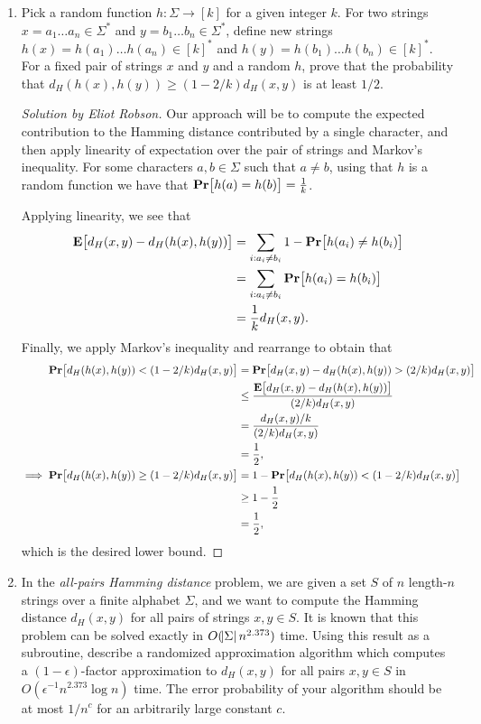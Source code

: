 \documentclass{article}
\newenvironment{solution}[1]{\begin{proof}[Solution by #1]}{\end{proof}}
\begin{document}
\begin{enumerate}
	\item Pick a random function \(h : \Sigma \to [k]\) for a given integer \(k\). For two strings \(x = a_1 \dots a_n \in \Sigma^*\) and \(y = b_1 \dots b_n \in \Sigma^*\), define new strings \(h(x) = h(a_1) \dots h(a_n) \in [k]^*\) and \(h(y) = h(b_1) \dots h(b_n) \in [k]^*\). For a fixed pair of strings \(x\) and \(y\) and a random \(h\), prove that the probability that \(d_H(h(x), h(y)) \geq (1 - 2/k) d_H(x, y)\) is at least \(1/2\).
	
	\begin{solution}{Eliot Robson}
		Our approach will be to compute the expected contribution to the Hamming distance contributed by a single character, and then apply linearity of expectation over the pair of strings and Markov's inequality. For some characters \(a, b \in \Sigma\) such that \(a \neq b\), using that \(h\) is a random function we have that \(\Prob{h(a) = h(b)} = \frac{1}{k}\).
		
		Applying linearity, we see that 
		\begin{align*}
			\Exp{d_H(x, y) - d_H (h(x), h(y))}
			&=%
			\sum_{i : a_i \neq b_i} 1 - \Prob{h(a_i) \neq h(b_i)}\\
			&=%
			\sum_{i : a_i \neq b_i} \Prob{h(a_i) = h(b_i)}\\
			&=%
			\frac{1}{k} d_H(x,y).
		\end{align*}
		Finally, we apply Markov's inequality and rearrange to obtain that
		\begin{align*}
			\Prob{d_H (h(x), h(y)) < (1 - 2/k) d_H(x, y)}
			&=%
			\Prob{d_H (x,y) - d_H (h(x), h(y)) > (2/k) d_H (x,y)}\\
			&\leq%
			\frac{\Exp{d_H (x,y) - d_H (h(x), h(y))}}{(2/k) d_H (x,y)}\\
			&=%
			\frac{d_H(x,y) / k}{(2/k) d_H (x,y)}\\
			&=%
			\frac{1}{2},\\
			\implies
			\Prob{d_H (h(x), h(y)) \geq (1 - 2/k) d_H(x, y)}
			&=%
			1 - \Prob{d_H (h(x), h(y)) < (1 - 2/k) d_H(x, y)}\\
			&\geq%
			1 - \frac{1}{2}\\
			&=%
			\frac{1}{2},
		\end{align*}
		which is the desired lower bound.
	\end{solution}

	\item In the \emph{all-pairs Hamming distance} problem, we are given a set \(S\) of \(n\) length-\(n\) strings over a finite alphabet \(\Sigma\), and we want to compute the Hamming distance \(d_H (x,y)\) for all pairs of strings \(x,y \in S\). It is known that this problem can be solved exactly in \(O(\abs{\Sigma} n^{2.373})\) time. Using this result as a subroutine, describe a randomized approximation algorithm which computes a \((1 - \epsilon)\)-factor approximation to \(d_H(x,y)\) for all pairs \(x,y \in S\) in \(O(\epsilon^{-1} n^{2.373} \log n)\) time. The error probability of your algorithm should be at most \(1 / n^c\) for an arbitrarily large constant \(c\).
	

\end{enumerate}
\end{document}
